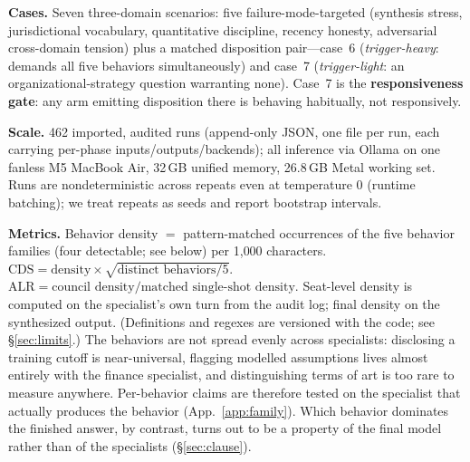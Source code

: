 \documentclass[11pt]{article}
\begin{document}
\textbf{Cases.} Seven three-domain scenarios: five failure-mode-targeted (synthesis stress, jurisdictional vocabulary, quantitative discipline, recency honesty, adversarial cross-domain tension) plus a matched disposition pair---case~6 (\emph{trigger-heavy}: demands all five behaviors simultaneously) and case~7 (\emph{trigger-light}: an organizational-strategy question warranting none). Case~7 is the \textbf{responsiveness gate}: any arm emitting disposition there is behaving habitually, not responsively.

\textbf{Scale.} 462 imported, audited runs (append-only JSON, one file per run, each carrying per-phase inputs/outputs/backends); all inference via Ollama on one fanless M5 MacBook Air, 32\,GB unified memory, 26.8\,GB Metal working set. Runs are nondeterministic across repeats even at temperature 0 (runtime batching); we treat repeats as seeds and report bootstrap intervals.

\textbf{Metrics.} Behavior density $=$ pattern-matched occurrences of the five behavior families (four detectable; see below) per 1{,}000 characters. $\text{CDS} = \text{density} \times \sqrt{\text{distinct behaviors}/5}$. $\text{ALR} = \text{council density} / \text{matched single-shot density}$. Seat-level density is computed on the specialist's own turn from the audit log; final density on the synthesized output. (Definitions and regexes are versioned with the code; see \S\ref{sec:limits}.) The behaviors are not spread evenly across specialists: disclosing a training
cutoff is near-universal, flagging modelled assumptions lives almost entirely
with the finance specialist, and distinguishing terms of art is too rare to
measure anywhere. Per-behavior claims are therefore tested on the specialist
that actually produces the behavior (App.~\ref{app:family}). Which behavior
dominates the finished answer, by contrast, turns out to be a property of the
final model rather than of the specialists (\S\ref{sec:clause}).
\end{document}
